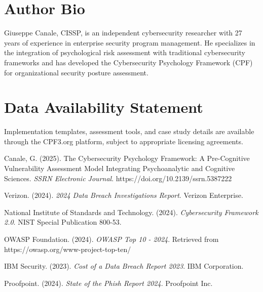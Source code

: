 \documentclass[11pt,a4paper]{article}
\begin{document}
\section*{Author Bio}

Giuseppe Canale, CISSP, is an independent cybersecurity researcher with 27 years of experience in enterprise security program management. He specializes in the integration of psychological risk assessment with traditional cybersecurity frameworks and has developed the Cybersecurity Psychology Framework (CPF) for organizational security posture assessment.

\section*{Data Availability Statement}

Implementation templates, assessment tools, and case study details are available through the CPF3.org platform, subject to appropriate licensing agreements.

\begin{thebibliography}{99}

Canale, G. (2025). The Cybersecurity Psychology Framework: A Pre-Cognitive Vulnerability Assessment Model Integrating Psychoanalytic and Cognitive Sciences. \textit{SSRN Electronic Journal}. https://doi.org/10.2139/ssrn.5387222

Verizon. (2024). \textit{2024 Data Breach Investigations Report}. Verizon Enterprise.

National Institute of Standards and Technology. (2024). \textit{Cybersecurity Framework 2.0}. NIST Special Publication 800-53.

OWASP Foundation. (2024). \textit{OWASP Top 10 - 2024}. Retrieved from https://owasp.org/www-project-top-ten/

IBM Security. (2023). \textit{Cost of a Data Breach Report 2023}. IBM Corporation.

Proofpoint. (2024). \textit{State of the Phish Report 2024}. Proofpoint Inc.

\end{thebibliography}
\end{document}
